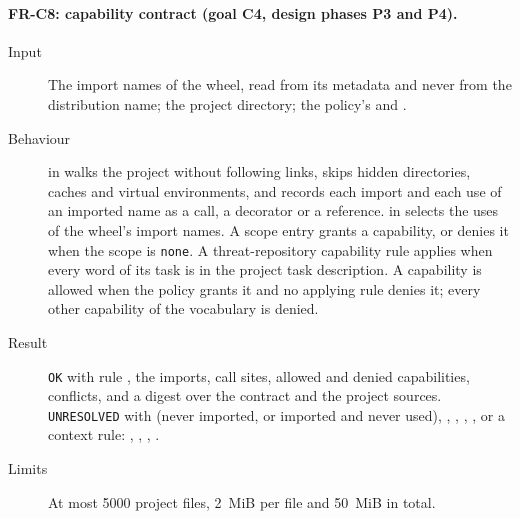 \paragraph{FR-C8: capability contract (goal C4, design phases P3 and P4).}
\begin{sloppypar}
\begin{description}
    \item[Input] The import names of the wheel, read from its metadata and never from the distribution name; the project directory; the policy's  and .
    \item[Behaviour]  in  walks the project without following links, skips hidden directories, caches and virtual environments, and records each import and each use of an imported name as a call, a decorator or a reference.  in  selects the uses of the wheel's import names. A scope entry grants a capability, or denies it when the scope is \texttt{none}. A threat-repository capability rule applies when every word of its task is in the project task description. A capability is allowed when the policy grants it and no applying rule denies it; every other capability of the vocabulary is denied.
    \item[Result] \texttt{OK} with rule , the imports, call sites, allowed and denied capabilities, conflicts, and a digest over the contract and the project sources. \texttt{UNRESOLVED} with  (never imported, or imported and never used), , , , , or a context rule: , , , .
    \item[Limits] At most 5000 project files, 2~MiB per file and 50~MiB in total.
\end{description}
\end{sloppypar}


